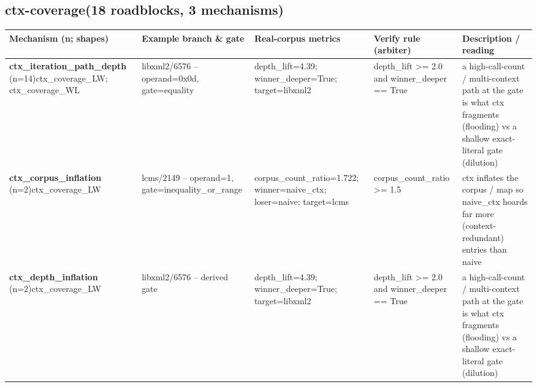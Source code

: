 \documentclass[7pt]{extarticle}
\begin{document}
\subsection*{ctx-coverage\quad(18 roadblocks, 3 mechanisms)}
{\scriptsize\begin{longtable}{@{}p{3.3cm}p{3.6cm}p{4.4cm}p{4.2cm}p{6.6cm}@{}}
\toprule \textbf{Mechanism (n; shapes)}&\textbf{Example branch \& gate}&\textbf{Real-corpus metrics}&\textbf{Verify rule (arbiter)}&\textbf{Description / reading}\\\midrule\endhead
\textbf{ctx\_\allowbreak iteration\_\allowbreak path\_\allowbreak depth} (n=14)\newline ctx\_\allowbreak coverage\_\allowbreak LW; ctx\_\allowbreak coverage\_\allowbreak WL & libxml2/6576 -- operand=0x0d, gate=equality & depth\_\allowbreak lift=4.39; winner\_\allowbreak deeper=True; target=libxml2 & depth\_\allowbreak lift \textgreater{}= 2.0 and winner\_\allowbreak deeper == True & a high-call-count / multi-context path at the gate is what ctx fragments (flooding) vs a shallow exact-literal gate (dilution)\\\midrule
\textbf{ctx\_\allowbreak corpus\_\allowbreak inflation} (n=2)\newline ctx\_\allowbreak coverage\_\allowbreak LW & lcms/2149 -- operand=1, gate=inequality\_\allowbreak or\_\allowbreak range & corpus\_\allowbreak count\_\allowbreak ratio=1.722; winner=naive\_\allowbreak ctx; loser=naive; target=lcms & corpus\_\allowbreak count\_\allowbreak ratio \textgreater{}= 1.5 & ctx inflates the corpus / map so naive\_\allowbreak ctx hoards far more (context-redundant) entries than naive\\\midrule
\textbf{ctx\_\allowbreak depth\_\allowbreak inflation} (n=2)\newline ctx\_\allowbreak coverage\_\allowbreak LW & libxml2/6576 -- derived gate & depth\_\allowbreak lift=4.39; winner\_\allowbreak deeper=True; target=libxml2 & depth\_\allowbreak lift \textgreater{}= 2.0 and winner\_\allowbreak deeper == True & a high-call-count / multi-context path at the gate is what ctx fragments (flooding) vs a shallow exact-literal gate (dilution)\\\midrule
\bottomrule\end{longtable}}\par\medskip
\end{document}
